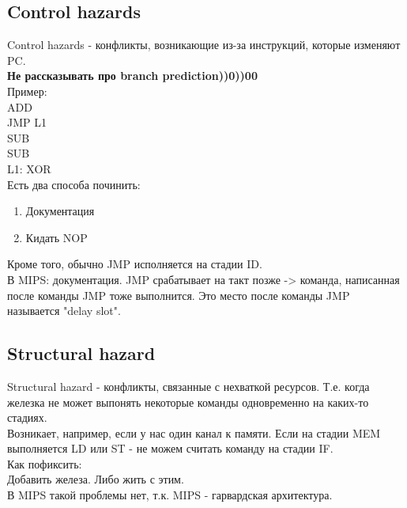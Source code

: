 \documentclass[12pt, a4paper]{article}
\begin{document}
\subsection{Control hazards}
Control hazards - конфликты, возникающие из-за инструкций, которые изменяют PC.\\
\textbf{Не рассказывать про branch prediction))0))00}\\
Пример:\\
ADD\\
JMP L1\\
SUB\\
SUB \\
L1: XOR\\
Есть два способа починить:
\begin{enumerate}
    \item Документация
    \item Кидать NOP
\end{enumerate}
Кроме того, обычно JMP исполняется на стадии ID.\\
В MIPS: документация. JMP срабатывает на такт позже -> команда, написанная после команды JMP тоже выполнится. Это место после команды JMP называется "delay slot".
\subsection{Structural hazard}
Structural hazard - конфликты, связанные с нехваткой ресурсов. Т.е. когда железка не может выпонять некоторые команды одновременно на каких-то стадиях.\\
Возникает, например, если у нас один канал к памяти. Если на стадии MEM выполняется LD или ST - не можем считать команду на стадии IF.\\
Как пофиксить:\\
Добавить железа. Либо жить с этим.\\
В MIPS такой проблемы нет, т.к. MIPS - гарвардская архитектура.
\end{document}
